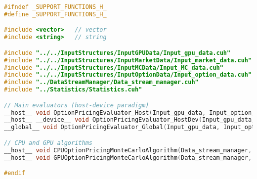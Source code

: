 \begin{lstlisting}[language=C++, caption={\texttt{libraries/CoreLibraries/SupportFunctions/Support\_functions.cuh}}]
#ifndef _SUPPORT_FUNCTIONS_H_
#define _SUPPORT_FUNCTIONS_H_

#include <vector>	// vector
#include <string>	// string

#include "../../InputStructures/InputGPUData/Input_gpu_data.cuh"
#include "../../InputStructures/InputMarketData/Input_market_data.cuh"
#include "../../InputStructures/InputMCData/Input_MC_data.cuh"
#include "../../InputStructures/InputOptionData/Input_option_data.cuh"
#include "../DataStreamManager/Data_stream_manager.cuh"
#include "../Statistics/Statistics.cuh"

// Main evaluators (host-device paradigm)
__host__ void OptionPricingEvaluator_Host(Input_gpu_data, Input_option_data, Input_market_data, Input_MC_data, Statistics* exactOutputs, Statistics* eulerOutputs, unsigned int seed);
__host__ __device__ void OptionPricingEvaluator_HostDev(Input_gpu_data, Input_option_data, Input_market_data, Input_MC_data, Statistics* exactOutputs, Statistics* eulerOutputs, unsigned int seed, unsigned int threadNumber);
__global__ void OptionPricingEvaluator_Global(Input_gpu_data, Input_option_data, Input_market_data, Input_MC_data, Statistics* exactOutputs, Statistics* eulerOutputs, unsigned int seed);

// CPU and GPU algorithms
__host__ void CPUOptionPricingMonteCarloAlgorithm(Data_stream_manager, Input_gpu_data, Input_option_data, Input_market_data, Input_MC_data, unsigned int seed);
__host__ void GPUOptionPricingMonteCarloAlgorithm(Data_stream_manager, Input_gpu_data, Input_option_data, Input_market_data, Input_MC_data, unsigned int seed);

#endif
\end{lstlisting}

